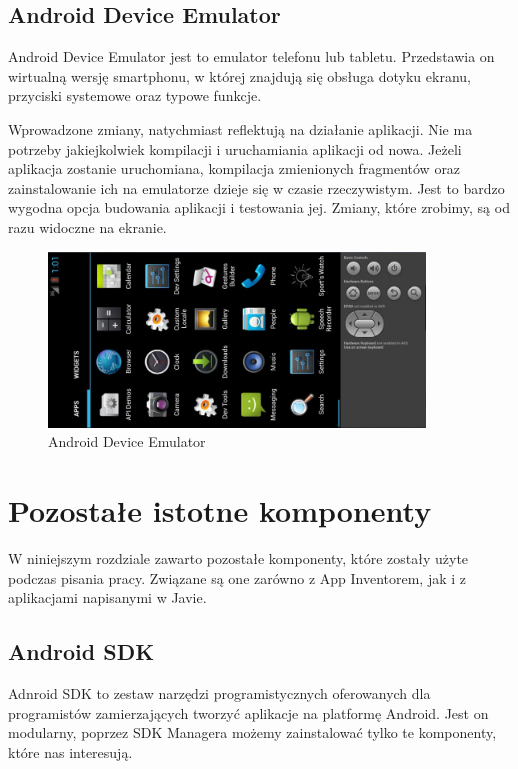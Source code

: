 \subsection{Android Device Emulator}
\label{c223}

Android Device Emulator jest to emulator telefonu lub tabletu. Przedstawia on wirtualną wersję smartphonu, w której znajdują się obsługa dotyku ekranu, przyciski systemowe oraz typowe funkcje.

Wprowadzone zmiany, natychmiast reflektują na działanie aplikacji. Nie ma potrzeby jakiejkolwiek kompilacji i uruchamiania aplikacji od nowa. Jeżeli aplikacja zostanie uruchomiana, kompilacja zmienionych fragmentów oraz zainstalowanie ich na emulatorze dzieje się w czasie rzeczywistym. Jest to bardzo wygodna opcja budowania aplikacji i testowania jej. Zmiany, które zrobimy, są od razu widoczne na ekranie.

\begin{figure}[th] 
\centering\includegraphics[width=10cm]{figures/emulator}
\caption{Android Device Emulator}
\end{figure}

\section{Pozostałe istotne komponenty}

W niniejszym rozdziale zawarto pozostałe komponenty, które zostały użyte podczas pisania pracy. Związane są one zarówno z App Inventorem, jak i z aplikacjami napisanymi w Javie.

\subsection{Android SDK}

Adnroid SDK to zestaw narzędzi programistycznych oferowanych dla programistów zamierzających tworzyć aplikacje na platformę Android. Jest on modularny, poprzez SDK Managera możemy zainstalować tylko te komponenty, które nas interesują.
 
